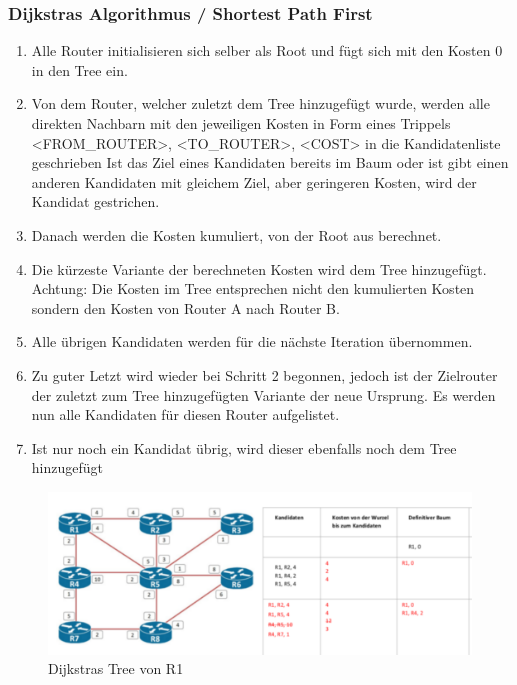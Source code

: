 \subsubsection{Dijkstras Algorithmus / Shortest Path First}
\begin{enumerate}
	\item Alle Router initialisieren sich selber als Root und fügt sich mit den Kosten 0 in den Tree ein.
	\item Von dem Router, welcher zuletzt dem Tree hinzugefügt wurde, werden alle direkten Nachbarn mit den jeweiligen Kosten in Form eines Trippels	<FROM\_ROUTER>, <TO\_ROUTER>, <COST> in die Kandidatenliste geschrieben
	\subitem Ist das Ziel eines Kandidaten bereits im Baum oder ist gibt einen anderen Kandidaten mit gleichem Ziel, aber geringeren Kosten, wird der Kandidat gestrichen.
	\item Danach werden die Kosten kumuliert, von der Root aus berechnet.
	\item Die kürzeste Variante der berechneten Kosten wird dem Tree hinzugefügt. Achtung: Die Kosten im Tree entsprechen nicht den kumulierten Kosten sondern den Kosten von Router A nach Router B. 
	\item Alle übrigen Kandidaten werden für die nächste Iteration übernommen.
	\item Zu guter Letzt wird wieder bei Schritt 2 begonnen, jedoch ist der Zielrouter der zuletzt zum Tree hinzugefügten Variante der neue Ursprung. Es werden nun alle Kandidaten für diesen Router aufgelistet.
	\item Ist nur noch ein Kandidat übrig, wird dieser ebenfalls noch dem Tree hinzugefügt
\end{enumerate}
\begin{figure}[h]
\centering
\includegraphics[width=0.7\linewidth]{images/dijkstra}
\caption{Dijkstras Tree von R1}
\end{figure}


